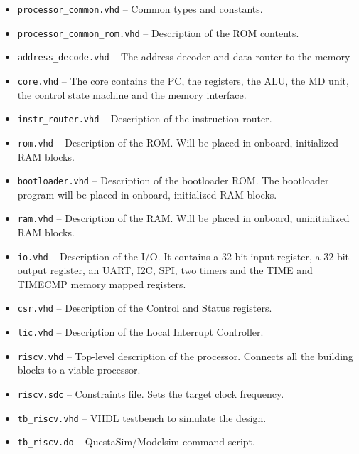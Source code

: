\documentclass[12pt]{article}
\begin{document}
\begin{itemize}
\item \lstinline|processor_common.vhd| -- Common types and constants.
\item \lstinline|processor_common_rom.vhd| -- Description of the ROM contents.
\item \lstinline|address_decode.vhd| -- The address decoder and data router to the memory \item \lstinline|core.vhd| -- The core contains the PC, the registers, the ALU, the MD unit, the control state machine and the memory interface.
\item \lstinline|instr_router.vhd| -- Description of the instruction router.
\item \lstinline|rom.vhd| -- Description of the ROM. Will be placed in onboard, initialized RAM blocks. 
\item \lstinline|bootloader.vhd| -- Description of the bootloader ROM. The bootloader program will be placed in onboard, initialized RAM blocks. 
\item \lstinline|ram.vhd| -- Description of the RAM. Will be placed in onboard, uninitialized RAM blocks. 
\item \lstinline|io.vhd| -- Description of the I/O. It contains a 32-bit input register, a 32-bit output register, an UART, I2C, SPI, two timers and the TIME and TIMECMP memory mapped registers.
\item \lstinline|csr.vhd| -- Description of the Control and Status registers.
\item \lstinline|lic.vhd| -- Description of the Local Interrupt Controller.
\item \lstinline|riscv.vhd| -- Top-level description of the processor. Connects all the building blocks to a viable processor.
\item \lstinline|riscv.sdc| -- Constraints file. Sets the target clock frequency.
\item \lstinline|tb_riscv.vhd| -- VHDL testbench to simulate the design.
\item \lstinline|tb_riscv.do| -- QuestaSim/Modelsim command script.
\end{itemize}
\end{document}
